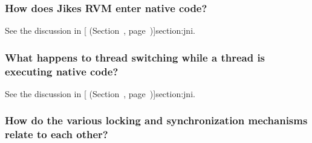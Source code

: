 \subsubsection{How does Jikes RVM enter native code?}

See the discussion in [
  (Section~\Ref, page~\Pageref)]{section:jni}. 

\subsubsection{What happens to thread switching while a thread is
executing native code?}
See the discussion in [ (Section~\Ref, page~\Pageref)]{section:jni}. 

\subsubsection{How do the various locking and synchronization mechanisms
relate to each other?}

